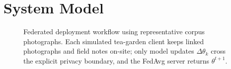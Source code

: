 \documentclass[conference]{IEEEtran}
\newcommand{\archw}{0.47}
\begin{document}

\section{System Model}
\label{sec:sysmodel}

\begin{figure}[!tb]
\centering
\resizebox{\archw\textwidth}{!}{}
\caption{Federated deployment workflow using representative corpus
photographs. Each simulated tea-garden client keeps linked photographs and
field notes on-site; only model updates $\Delta\theta_k$ cross the explicit
privacy boundary, and the FedAvg server returns $\theta^{t+1}$.}
\label{fig:arch}
\end{figure}
\end{document}
